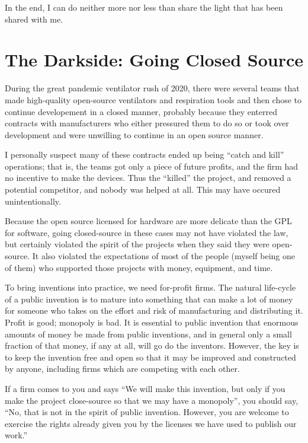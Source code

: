\documentclass[
	fontsize=10pt, %
	twoside=false, %
	secnumdepth=1, %
]{kaobook}
\begin{document}
In the end, I can do neither more nor less than share the light that has been shared with me.


\section{The Darkside: Going Closed Source}

During the great pandemic ventilator rush of 2020,
there were several teams that made high-quality
open-source ventilators and respiration tools and
then chose to continue developement in a closed manner,
probably because they enterred contracts with manufacturers
who either pressured them to do so or took over development
and were unwilling to continue in an open source manner.

I personally suspect many of these contracts ended
up being ``catch and kill'' operations; that is,
the teams got only a piece of future profits, and
the firm had no incentive to make the devices.
Thus the ``killed'' the project, and removed a potential
competitor, and nobody was helped at all.
This may have occured unintentionally.

Because the open source licensed for hardware are
more delicate than the GPL for software, going
closed-source in these cases may not have violated
the law, but certainly violated the spirit of the
projects when they said they were open-source.
It also violated the expectations of most
of the people (myself being one of them)
who supported those projects with money,
equipment, and time.

To bring inventions into practice, we need
for-profit firms. The natural life-cycle
of a public invention is to mature into
something that can make a lot of money
for someone who takes on the effort and
risk of manufacturing and distributing it.
Profit is good; monopoly is bad.
It is essential to public invention that
enormous amounts of money be made from public inventions,
and in general only a small fraction of that money,
if any at all, will go do the inventors.
However, the key is to keep the invention
free and open so that it may be improved
and constructed by anyone, including firms
which are competing with each other.

If a firm comes to you and says
``We will make this invention, but only
if you make the project close-source so
that we may have a monopoly'', you should
say, ``No, that is not in the spirit of public invention.
However, you are welcome to exercise the rights
already given you by the licenses we have used to
publish our work.''
\end{document}
